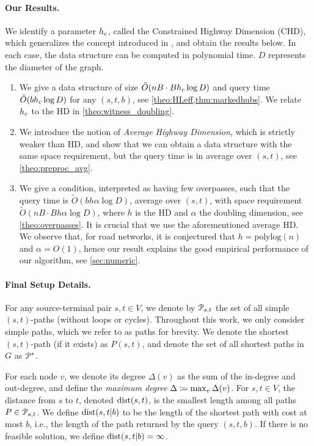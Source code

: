 \paragraph{Our Results.}
We identify a parameter $h_c$, called the Constrained Highway Dimension (CHD), which generalizes the concept introduced in \citep{highway2010}, and obtain the results below.
In each case, the data structure can be computed in polynomial time.
$D$ represents the diameter of the graph.
\begin{enumerate}
\item We give a data structure of size $\tilde O(nB\cdot Bh_c\log D)$ and query time $\tilde O(bh_c\log D)$ for any $(s,t,b)$, see \cref{theo:HLeff,thm:markedhubs}.
We relate $h_c$ to the HD in \cref{theo:witness_doubling}.
\item We introduce the notion of \emph{Average Highway Dimension}, which is strictly weaker than HD, and show that we can obtain a data structure with the same space requirement, but the query time is in average over $(s,t)$, see \cref{theo:preproc_avg}.
\item We give a condition, interpreted as having few overpasses, such that the query time is  $\tilde O(bh\alpha\log D)$, average over $(s,t)$, with space requirement $\tilde O(n B\cdot Bh\alpha\log D)$, where $h$ is the HD and $\alpha$ the doubling dimension, see \cref{theo:overpasses}.
It is crucial that we use the aforementioned average HD.
We observe that, for road networks, it is conjectured that $h=\text{polylog}(n)$ and $\alpha=O(1)$, hence our result explains the good empirical performance of our algorithm, see \cref{sec:numeric}.
\end{enumerate}


\medskip
\paragraph{Final Setup Details.}
For any source-terminal pair $s,t\in V$, we denote by $\mathcal{P}_{s,t}$ the set of all simple $(s,t)$-paths (without loops or cycles). 
Throughout this work, we only consider simple paths, which we refer to as paths for brevity.
We denote the shortest $(s,t)$-path (if it exists) as $P(s,t)$, and denote the set of all shortest paths in $G$ as $\mathcal{P}^*$.

For each node $v$, we denote its degree $\Delta(v)$ as the sum of the in-degree and out-degree, and define the \emph{maximum degree} $\Delta \coloneqq \max_v\Delta(v)$.
For $s,t\in V$, the distance from $s$ to $t$, denoted $\mbox{dist}(s,t)$, is the smallest length among all paths $P\in\mathcal{P}_{s,t}$.
We define $\mbox{dist}(s,t|b)$ to be the length of the shortest path with cost at most $b$, i.e., the length of the path returned by the query $(s,t,b)$.
If there is no feasible solution, we define $\mbox{dist}(s,t|b)=\infty$.

